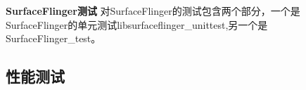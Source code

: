 
\textbf{SurfaceFlinger测试}
对SurfaceFlinger的测试包含两个部分，一个是SurfaceFlinger的单元测试libsurfaceflinger\_unittest,另一个是SurfaceFlinger\_test。


\subsection{性能测试}









